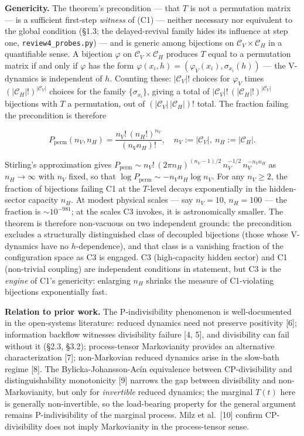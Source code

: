 \documentclass[
]{article}
\begin{document}
\textbf{Genericity.} The theorem's precondition --- that \(T\) is not a
permutation matrix --- is a sufficient first-step \emph{witness} of (C1)
--- neither necessary nor equivalent to the global condition (§1.3; the
delayed-revival family hides its influence at step one,
\texttt{review4\_probes.py}) --- and is generic among bijections on
\(\mathcal{C}_V \times \mathcal{C}_H\) in a quantifiable sense. A
bijection \(\varphi\) on \(\mathcal{C}_V \times \mathcal{C}_H\) produces
\(T\) equal to a permutation matrix if and only if \(\varphi\) has the
form \(\varphi(x_i, h) = (\varphi_V(x_i), \sigma_{x_i}(h))\) --- the
V-dynamics is independent of \(h\). Counting these: \(|\mathcal{C}_V|!\)
choices for \(\varphi_V\) times \((|\mathcal{C}_H|!)^{|\mathcal{C}_V|}\)
choices for the family \(\{\sigma_{x_i}\}\), giving a total of
\(|\mathcal{C}_V|!\,(|\mathcal{C}_H|!)^{|\mathcal{C}_V|}\) bijections
with \(T\) a permutation, out of \((|\mathcal{C}_V|\,|\mathcal{C}_H|)!\)
total. The fraction failing the precondition is therefore

\[P_{\text{perm}}(n_V, n_H) = \frac{n_V!\,(n_H!)^{n_V}}{(n_V n_H)!}, \quad n_V := |\mathcal{C}_V|,\ n_H := |\mathcal{C}_H|.\]

Stirling's approximation gives
\(P_{\text{perm}} \sim n_V!\,(2\pi n_H)^{(n_V-1)/2}\, n_V^{-1/2}\, n_V^{-n_V n_H}\)
as \(n_H \to \infty\) with \(n_V\) fixed, so that
\(\log P_{\text{perm}} \sim -n_V n_H \log n_V\). For any \(n_V \geq 2\),
the fraction of bijections failing C1 at the \(T\)-level decays
exponentially in the hidden-sector capacity \(n_H\). At modest physical
scales --- say \(n_V = 10\), \(n_H = 100\) --- the fraction is
\(\sim 10^{-981}\); at the scales C3 invokes, it is astronomically
smaller. The theorem is therefore non-vacuous on two independent
grounds: the precondition excludes a structurally distinguished class of
decoupled bijections (those whose V-dynamics have no \(h\)-dependence),
and that class is a vanishing fraction of the configuration space as C3
is engaged. C3 (high-capacity hidden sector) and C1 (non-trivial
coupling) are independent conditions in statement, but C3 is the
\emph{engine} of C1's genericity: enlarging \(n_H\) shrinks the measure
of C1-violating bijections exponentially fast.

\textbf{Relation to prior work.} The P-indivisibility phenomenon is
well-documented in the open-systems literature: reduced dynamics need
not preserve positivity {[}6{]}; information backflow witnesses
divisibility failure {[}4, 5{]}, and divisibility can fail without it
(§2.3, §3.2); process-tensor Markovianity provides an alternative
characterization {[}7{]}; non-Markovian reduced dynamics arise in the
slow-bath regime {[}8{]}. The Bylicka-Johansson-Acín equivalence between
CP-divisibility and distinguishability monotonicity {[}9{]} narrows the
gap between divisibility and non-Markovianity, but only for
\emph{invertible} reduced dynamics; the marginal \(T(t)\) here is
generally non-invertible, so the load-bearing property for the general
argument remains P-indivisibility of the marginal process. Milz et
al.~{[}10{]} confirm CP-divisibility does not imply Markovianity in the
process-tensor sense.
\end{document}
